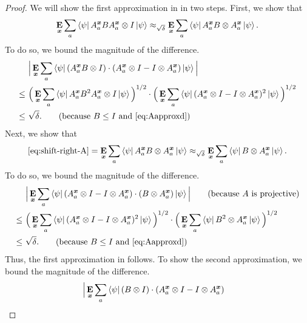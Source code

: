 \begin{proof}
  We will show the first approximation in  in two steps. First, we show that
  \begin{equation} \label{eq:shift-right-A}
    \mathop{\bf E\/}_{{\boldsymbol{x}}} \sum_a \bra{\psi} A^{{\boldsymbol{x}}}_a B A^{{\boldsymbol{x}}}_a \otimes I \ket{\psi} \approx_{\sqrt{\delta}}
    \mathop{\bf E\/}_{{\boldsymbol{x}}} \sum_a \bra{\psi} A^{{\boldsymbol{x}}}_a B \otimes A^{{\boldsymbol{x}}}_a \ket{\psi}.
  \end{equation}
  To do so, we bound the magnitude of the difference.
  \begin{align*}
   &\Big| \E_{\bx}\sum_a \bra{\psi} (A^{\bx}_a B \otimes I)\cdot (A^{\bx}_a \ot I  - I \ot A^{\bx}_a)  \ket{\psi} \Big|\\
    \leq~&
    \Big( \E_{\bx} \sum_a \bra{\psi} A^{\bx}_a
                 B^2
                 A^{\bx}_a \otimes I \ket{\psi} \Big)^{1/2}  
                \cdot \Big(\E_{\bx} \sum_a
                 \bra{\psi} (A^{\bx}_a \ot I - I \ot A^{\bx}_a)^2
                 \ket{\psi} \Big)^{1/2} \\
               \leq~& \sqrt{\delta}.\tag{because $B \leq I$ and \eqref{eq:Aapproxd}}
  \end{align*}
  Next, we show that
  \begin{equation*}
  \eqref{eq:shift-right-A} =  \mathop{\bf E\/}_{{\boldsymbol{x}}} \sum_a \bra{\psi} A^{{\boldsymbol{x}}}_a B \otimes A^{{\boldsymbol{x}}}_a \ket{\psi} \approx_{\sqrt{\delta}} \mathop{\bf E\/}_{{\boldsymbol{x}}} \sum_ a\bra{\psi} B \otimes A^{{\boldsymbol{x}}}_a \ket{\psi}.
  \end{equation*}
  To do so, we bound the magnitude of the difference.
  \begin{align*}
    &\Big|\E_{\bx} \sum_a \bra{\psi} (A^{\bx}_a \ot I - I \ot A^{\bx}_a) \cdot(B
    \ot A^{\bx}_a) \ket{\psi}\Big| \tag{because~$A$ is projective}\\ \leq~& \Big( \E_{\bx} \sum_a \bra{\psi}
                               (A^{\bx}_a \ot I - I \ot A^{\bx}_a)^2
                               \ket{\psi} \Big)^{1/2}  
                              \cdot \Big(\E_{\bx} \sum_a
                               \bra{\psi} B^2 \ot A^{\bx}_a \ket{\psi}
                               \Big)^{1/2} \\
                             \leq~& \sqrt{\delta}.\tag{because $B \leq I$ and \eqref{eq:Aapproxd}}
  \end{align*}
  Thus, the first approximation in 
  follows. To show the second approximation, we bound the magnitude of the difference.
  \begin{align*}
  &\Big|\E_{\bx}\sum_a \bra{\psi} (B\otimes I)  \cdot ( A^{\bx}_a \ot I - I \ot A^{\bx}_a )

\end{align*}
\end{proof}
